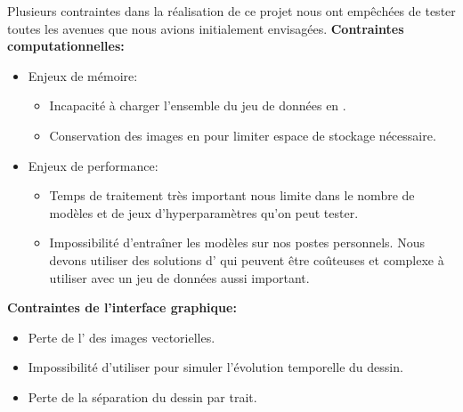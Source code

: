 Plusieurs contraintes dans la réalisation de ce projet nous ont empêchées de tester toutes les avenues que nous avions initialement envisagées.
\textbf{Contraintes computationnelles:}
\begin{itemize}
  \item Enjeux de mémoire:
	  \begin{itemize}
	      \item Incapacité à charger l'ensemble du jeu de données en .
	      \item Conservation des images en  pour limiter espace de stockage nécessaire.
	  \end{itemize}
  \item Enjeux de performance:
	  \begin{itemize}
		\item Temps de traitement très important nous limite dans le nombre de modèles et de jeux d'hyperparamètres qu'on peut tester.
		\item Impossibilité d'entraîner les modèles sur nos postes personnels. Nous devons utiliser des solutions d' qui peuvent être coûteuses et complexe à utiliser avec un jeu de données aussi important.
	\end{itemize}
\end{itemize}

\textbf{Contraintes de l'interface graphique:}
\begin{itemize}
    \item Perte de l' des images vectorielles.
    \item Impossibilité d'utiliser  pour simuler l'évolution temporelle du dessin.
	\item Perte de la séparation du dessin par trait.
\end{itemize}

\vspace{-.25mm}